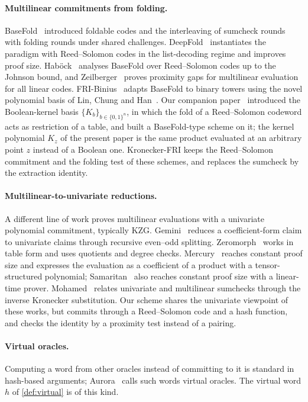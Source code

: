 \paragraph{Multilinear commitments from folding.}
BaseFold~\cite{ZCF24} introduced foldable codes and the interleaving of sumcheck rounds with folding rounds under shared challenges.
DeepFold~\cite{GLHQTZ25} instantiates the paradigm with Reed--Solomon codes in the list-decoding regime and improves proof size.
Hab\"ock~\cite{Hab24} analyses BaseFold over Reed--Solomon codes up to the Johnson bound, and Zeilberger~\cite{Zei26} proves proximity gaps for multilinear evaluation for all linear codes.
FRI-Binius~\cite{DP24} adapts BaseFold to binary towers using the novel polynomial basis of Lin, Chung and Han~\cite{LCH14}.
Our companion paper~\cite{Mkh26} introduced the Boolean-kernel basis $\{K_b\}_{b \in \{0,1\}^n}$, in which the fold of a Reed--Solomon codeword acts as restriction of a table, and built a BaseFold-type scheme on it; the kernel polynomial $K_z$ of the present paper is the same product evaluated at an arbitrary point $z$ instead of a Boolean one.
Kronecker-FRI keeps the Reed--Solomon commitment and the folding test of these schemes, and replaces the sumcheck by the extraction identity.

\paragraph{Multilinear-to-univariate reductions.}
A different line of work proves multilinear evaluations with a univariate polynomial commitment, typically KZG.
Gemini~\cite{BCHO22} reduces a coefficient-form claim to univariate claims through recursive even--odd splitting.
Zeromorph~\cite{KT24} works in table form and uses quotients and degree checks.
Mercury~\cite{EG25} reaches constant proof size and expresses the evaluation as a coefficient of a product with a tensor-structured polynomial; Samaritan~\cite{GPS25} also reaches constant proof size with a linear-time prover.
Mohamed~\cite{Moh25} relates univariate and multilinear sumchecks through the inverse Kronecker substitution.
Our scheme shares the univariate viewpoint of these works, but commits through a Reed--Solomon code and a hash function, and checks the identity by a proximity test instead of a pairing.

\paragraph{Virtual oracles.}
Computing a word from other oracles instead of committing to it is standard in hash-based arguments; Aurora~\cite{BCRSVW19} calls such words virtual oracles. The virtual word $h$ of \cref{def:virtual} is of this kind.

